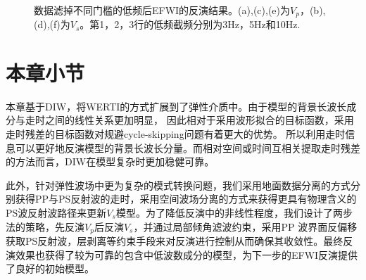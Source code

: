 \begin{figure}[!htb]
   \\
   \caption{数据滤掉不同门槛的低频后EFWI的反演结果。(a),(c),(e)为$V_p$，(b),(d),(f)为$V_s$。第1，2，3行的低频截频分别为3Hz，5Hz和10Hz.}
   \label{fig:LowFreqCut_EFWI}
\end{figure}



\section{本章小节}
本章基于DIW，将WERTI的方式扩展到了弹性介质中。由于模型的背景长波长成分与走时之间的线性关系更加明显，
因此相对于采用波形拟合的目标函数，采用走时残差的目标函数对规避cycle-skipping问题有着更大的优势。
所以利用走时信息可以更好地反演模型的背景长波长分量。而相对空间或时间互相关提取走时残差的方法而言，DIW在模型复杂时更加稳健可靠。

此外，针对弹性波场中更为复杂的模式转换问题，我们采用地面数据分离的方式分别获得PP与PS反射波的走时，采用空间波场分离的方式来获得更具有物理含义的
PS波反射波路径来更新$V_s$模型。为了降低反演中的非线性程度，我们设计了两步法的策略，先反演$V_p$后反演$V_s$，并通过局部倾角滤波约束，采用PP
波界面反偏移获取PS反射波，层剥离等约束手段来对反演进行控制从而确保其收敛性。最终反演效果也获得了较为可靠的包含中低波数成分的模型，为下一步的EFWI反演提供了良好的初始模型。
